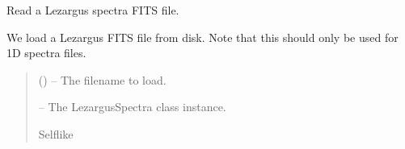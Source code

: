 \documentclass[letterpaper,11pt,english]{sphinxmanual}
\begin{document}
\begin{savenotes}
\begin{fulllineitems}
\begin{savenotes}
\begin{fulllineitems}
\begin{quote}
\begin{description}
\begin{itemize}
\end{itemize}

\end{description}\end{quote}

\end{fulllineitems}\end{savenotes}


\begin{savenotes}\begin{fulllineitems}
\label{\detokenize{code/lezargus.container.spectra:lezargus.container.spectra.LezargusSpectra.read_fits_file}}
\pysigstartsignatures
{}
\pysigstopsignatures
\sphinxAtStartPar
Read a Lezargus spectra FITS file.

\sphinxAtStartPar
We load a Lezargus FITS file from disk. Note that this should only
be used for 1\sphinxhyphen{}D spectra files.
\begin{quote}\begin{description}
\sphinxAtStartPar
{} () – The filename to load.

\sphinxAtStartPar
{} – The LezargusSpectra class instance.

\sphinxAtStartPar
Self\sphinxhyphen{}like

\end{description}\end{quote}

\end{fulllineitems}\end{savenotes}



\end{fulllineitems}
\end{savenotes}
\end{document}

